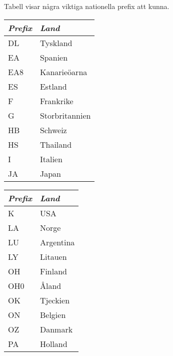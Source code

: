 Tabell  visar några viktiga nationella prefix att kunna.

\begin{table*}[ht]
  \begin{center}
    \begin{minipage}{.3\linewidth}
      \begin{tabular}{ll}
        \emph{Prefix} & \emph{Land} \\
        \hline
        DL            & Tyskland    \\
        EA            & Spanien        \\
        EA8           & Kanarieöarna   \\
        ES            & Estland     \\
        F             & Frankrike   \\
        G             & Storbritannien \\
        HB            & Schweiz     \\
        HS            & Thailand    \\
        I             & Italien     \\
        JA            & Japan          \\
      \end{tabular}
    \end{minipage}
    \begin{minipage}{.3\linewidth}
      \begin{tabular}{ll}
        \emph{Prefix} & \emph{Land} \\
        \hline
        K             & USA         \\
        LA            & Norge       \\
        LU            & Argentina      \\
        LY            & Litauen        \\
        OH            & Finland     \\
        OH0           & Åland          \\
        OK            & Tjeckien    \\
        ON            & Belgien     \\
        OZ            & Danmark     \\
        PA            & Holland        \\
      \end{tabular}
    \end{minipage}
    \begin{minipage}{.3\linewidth}

\end{minipage}
\end{center}
\end{table*}
